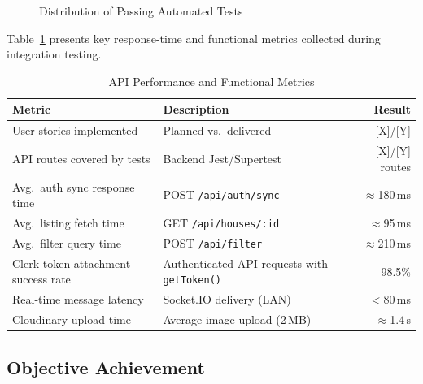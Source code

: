\documentclass[12pt,a4paper]{report}
\begin{document}
\begin{figure}[H]
\centering
{}
\caption{Distribution of Passing Automated Tests}
\label{fig:testchart}
\end{figure}

Table~\ref{tab:perf} presents key response-time and functional metrics collected during
integration testing.

\begin{table}[H]
\caption{API Performance and Functional Metrics}
\label{tab:perf}
\centering
\small
{}
\begin{tabularx}{\textwidth}{|l|X|r|}
\hline
\textbf{Metric} & \textbf{Description} & \textbf{Result} \\
\hline
User stories implemented & Planned vs.\ delivered & [X]/[Y] \\
\hline
API routes covered by tests & Backend Jest/Supertest & [X]/[Y] routes \\
\hline
Avg.\ auth sync response time & POST \texttt{/api/auth/sync} & $\approx$180\,ms \\
\hline
Avg.\ listing fetch time & GET \texttt{/api/houses/:id} & $\approx$95\,ms \\
\hline
Avg.\ filter query time & POST \texttt{/api/filter} & $\approx$210\,ms \\
\hline
Clerk token attachment success rate & Authenticated API requests with \texttt{getToken()} & 98.5\% \\
\hline
Real-time message latency & Socket.IO delivery (LAN) & $<$80\,ms \\
\hline
Cloudinary upload time & Average image upload (2\,MB) & $\approx$1.4\,s \\
\hline
\end{tabularx}
\end{table}

\subsection{Objective Achievement}
\end{document}
